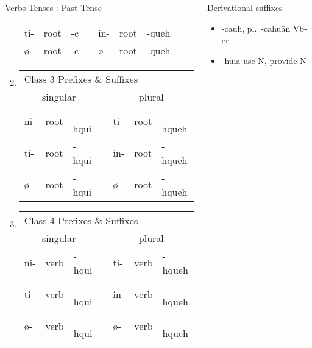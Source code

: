 \documentclass[12pt]{beamer}
\newcommand{\nah}[1]{\textcolor{nahgrn}{#1}}
\newcommand{\trs}[1]{\textcolor{nahblu}{#1}}
\begin{document}
\begin{frame}
\begin{columns}[t]
\begin{column}{.20\linewidth}
\begin{block}{Verbs Tenses : Past Tense}
\begin{enumerate}
\begin{tabular}[t]{lllllll}
						\nah{ti-}   & root & \trs{-c}   & \vline & \nah{in-}   & root & \trs{-queh}  \\
						\nah{ø-}    & root & \trs{-c}   & \vline & \nah{ø-}    & root & \trs{-queh}  \\
					\end{tabular}%
					\item \begin{tabular}[t]{lllllll}
						\multicolumn{7}{l}{Class 3 \nah{Prefixes} \& \trs{Suffixes}}       	         \\
						\multicolumn{3}{c}{singular}    & \vline & \multicolumn{3}{c}{plural}        \\
						\cline{1-7}
						\nah{ni-}   & root & \trs{-hqui}   & \vline & \nah{ti-}   & root & \trs{-hqueh}  \\
						\nah{ti-}   & root & \trs{-hqui}   & \vline & \nah{in-}   & root & \trs{-hqueh}  \\
						\nah{ø-}    & root & \trs{-hqui}   & \vline & \nah{ø-}    & root & \trs{-hqueh}  \\
					\end{tabular}%
					\item \begin{tabular}[t]{lllllll}
						\multicolumn{7}{l}{Class 4 \nah{Prefixes} \& \trs{Suffixes}}       	         \\
						\multicolumn{3}{c}{singular}    & \vline & \multicolumn{3}{c}{plural}        \\
						\cline{1-7}
						\nah{ni-}   & verb & \trs{-hqui}   & \vline & \nah{ti-}   & verb & \trs{-hqueh}  \\
						\nah{ti-}   & verb & \trs{-hqui}   & \vline & \nah{in-}   & verb & \trs{-hqueh}  \\
						\nah{ø-}    & verb & \trs{-hqui}   & \vline & \nah{ø-}    & verb & \trs{-hqueh}  \\
					\end{tabular}%
				\end{enumerate}
			\end{block}
		\end{column}
		\begin{column}{.23\linewidth}
			\begin{block}{Derivational suffixes}
				\begin{threeparttable}
					\begin{itemize}
						\item \nah{-cauh}, pl.~\nah{-cahuān}  \trs{Vb-er}
						\item \nah{-huia} \trs{use N, provide N}

\end{itemize}
\end{threeparttable}
\end{block}
\end{column}
\end{columns}
\end{frame}
\end{document}
